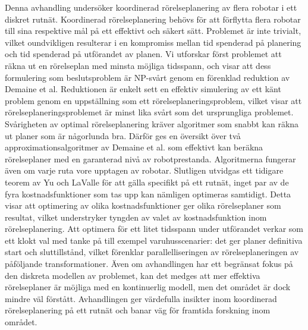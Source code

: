 \documentclass[main=english, 12pt, a4paper, sci, utf8, a-1b, online]{aaltothesis}
\date{\today}
\begin{document}
\makecoverpage

\makecopyrightpage


\begin{abstractpage}[english]
    \abstracttext{}
\end{abstractpage}

\newpage

\begin{abstractpage}[swedish]
Denna avhandling undersöker koordinerad rörelseplanering av flera robotar i ett diskret rutnät.
Koordinerad rörelseplanering behövs för att förflytta flera robotar till sina respektive mål på ett effektivt och säkert sätt.
Problemet är inte trivialt, vilket oundvikligen resulterar i en kompromiss mellan tid spenderad på planering och tid spenderad på utförandet av planen.
Vi utforskar först problemet att räkna ut en rörelseplan med minsta möjliga tidsspann, och visar att dess formulering som beslutsproblem är NP-svårt genom en förenklad reduktion av Demaine et al.
Reduktionen är enkelt sett en effektiv simulering av ett känt problem genom en uppställning som ett rörelseplaneringsproblem, vilket visar att rörelseplaneringsproblemet är minst lika svårt som det ursprungliga problemet.
Svårigheten av optimal rörelseplanering kräver algoritmer som snabbt kan räkna ut planer som är någorlunda bra.
Därför ges en översikt över två approximationsalgoritmer av Demaine et al. som effektivt kan beräkna rörelseplaner med en garanterad nivå av robotprestanda.
Algoritmerna fungerar även om varje ruta vore upptagen av robotar.
Slutligen utvidgas ett tidigare teorem av Yu och LaValle för att gälla specifikt på ett rutnät, inget par av de fyra kostnadsfunktioner som tas upp kan nämligen optimeras samtidigt. Detta visar att optimering av olika kostnadsfunktioner ger olika rörelseplaner som resultat, vilket understryker tyngden av valet av kostnadsfunktion inom rörelseplanering.
Att optimera för ett litet tidsspann under utförandet verkar som ett klokt val med tanke på till exempel varuhusscenarier: det ger planer definitiva start och sluttillstånd, vilket förenklar parallelliseringen av rörelseplaneringen av påföljande transformationer.
Även om avhandlingen har ett begränsat fokus på den diskreta modellen av problemet, kan det medges att mer effektiva rörelseplaner är möjliga med en kontinuerlig modell, men det området är dock mindre väl förstått.
Avhandlingen ger värdefulla insikter inom koordinerad rörelseplanering på ett rutnät och banar väg för framtida forskning inom området.
\end{abstractpage}
\end{document}
